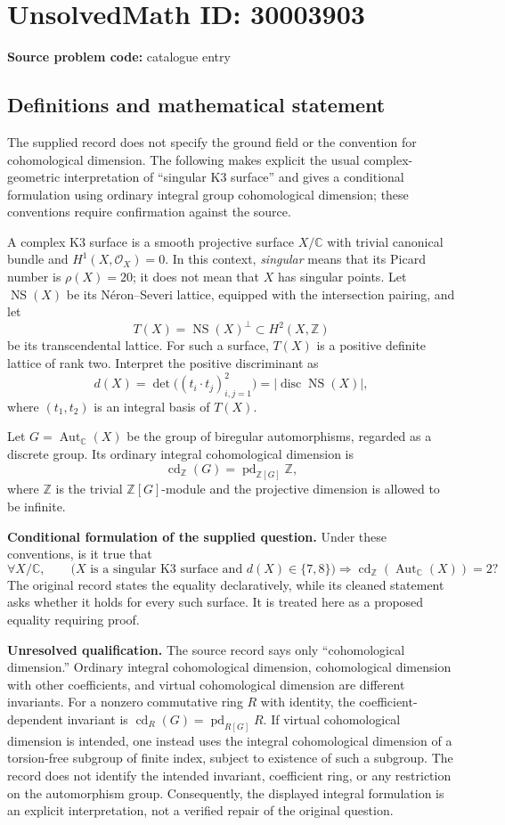 \documentclass[11pt]{article}
\newcommand{\Z}{\mathbb{Z}}
\newcommand{\C}{\mathbb{C}}
\begin{document}
\section*{UnsolvedMath ID: 30003903}
\textbf{Source problem code:} catalogue entry
\subsection{Definitions and mathematical statement}
The supplied record does not specify the ground field or the convention for cohomological dimension. The following makes explicit the usual complex-geometric interpretation of ``singular K3 surface'' and gives a conditional formulation using ordinary integral group cohomological dimension; these conventions require confirmation against the source.

A complex K3 surface is a smooth projective surface \(X/\C\) with trivial canonical bundle and \(H^1(X,\mathcal O_X)=0\). In this context, \emph{singular} means that its Picard number is \(\rho(X)=20\); it does not mean that \(X\) has singular points. Let \(\operatorname{NS}(X)\) be its N\'eron--Severi lattice, equipped with the intersection pairing, and let
\[
T(X)=\operatorname{NS}(X)^{\perp}\subset H^2(X,\Z)
\]
be its transcendental lattice. For such a surface, \(T(X)\) is a positive definite lattice of rank two. Interpret the positive discriminant as
\[
d(X)=\det\bigl((t_i\cdot t_j)_{i,j=1}^{2}\bigr)
       =\bigl|\operatorname{disc}\operatorname{NS}(X)\bigr|,
\]
where \((t_1,t_2)\) is an integral basis of \(T(X)\).

Let \(G=\operatorname{Aut}_{\C}(X)\) be the group of biregular automorphisms, regarded as a discrete group. Its ordinary integral cohomological dimension is
\[
\operatorname{cd}_{\Z}(G)
=\operatorname{pd}_{\Z[G]}\Z,
\]
where \(\Z\) is the trivial \(\Z[G]\)-module and the projective dimension is allowed to be infinite.

\textbf{Conditional formulation of the supplied question.} Under these conventions, is it true that
\[
\forall X/\C,\qquad
\bigl(X\text{ is a singular K3 surface and }d(X)\in\{7,8\}\bigr)
\Longrightarrow
\operatorname{cd}_{\Z}\!\left(\operatorname{Aut}_{\C}(X)\right)=2?
\]
The original record states the equality declaratively, while its cleaned statement asks whether it holds for every such surface. It is treated here as a proposed equality requiring proof.

\textbf{Unresolved qualification.} The source record says only ``cohomological dimension.'' Ordinary integral cohomological dimension, cohomological dimension with other coefficients, and virtual cohomological dimension are different invariants. For a nonzero commutative ring \(R\) with identity, the coefficient-dependent invariant is \(\operatorname{cd}_{R}(G)=\operatorname{pd}_{R[G]}R\). If virtual cohomological dimension is intended, one instead uses the integral cohomological dimension of a torsion-free subgroup of finite index, subject to existence of such a subgroup. The record does not identify the intended invariant, coefficient ring, or any restriction on the automorphism group. Consequently, the displayed integral formulation is an explicit interpretation, not a verified repair of the original question.
\end{document}
